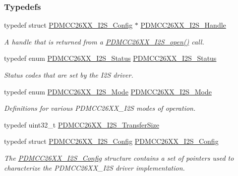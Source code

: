 \subsubsection*{Typedefs}
\begin{DoxyCompactItemize}
\item 
typedef struct \hyperlink{struct_p_d_m_c_c26_x_x___i2_s___config}{P\+D\+M\+C\+C26\+X\+X\+\_\+\+I2\+S\+\_\+\+Config} $\ast$ \hyperlink{_p_d_m_c_c26_x_x__util_8h_adc3b274b4a54e54316ad385fd4290c80}{P\+D\+M\+C\+C26\+X\+X\+\_\+\+I2\+S\+\_\+\+Handle}
\begin{DoxyCompactList}\small\item\em A handle that is returned from a \hyperlink{_p_d_m_c_c26_x_x__util_8h_a8168bcdab9f1e46c26823555df6f797f}{P\+D\+M\+C\+C26\+X\+X\+\_\+\+I2\+S\+\_\+open()} call. \end{DoxyCompactList}\item 
typedef enum \hyperlink{_p_d_m_c_c26_x_x__util_8h_ac1e4fbeb33409a874015d4e0609ddff1}{P\+D\+M\+C\+C26\+X\+X\+\_\+\+I2\+S\+\_\+\+Status} \hyperlink{_p_d_m_c_c26_x_x__util_8h_ad0f2102751f8a8f0bcd47dd154aa836c}{P\+D\+M\+C\+C26\+X\+X\+\_\+\+I2\+S\+\_\+\+Status}
\begin{DoxyCompactList}\small\item\em Status codes that are set by the I2\+S driver. \end{DoxyCompactList}\item 
typedef enum \hyperlink{_p_d_m_c_c26_x_x__util_8h_a7392b654a84f42e717a4df1485058a84}{P\+D\+M\+C\+C26\+X\+X\+\_\+\+I2\+S\+\_\+\+Mode} \hyperlink{_p_d_m_c_c26_x_x__util_8h_a2f220663270b5388de54e612e5773d98}{P\+D\+M\+C\+C26\+X\+X\+\_\+\+I2\+S\+\_\+\+Mode}
\begin{DoxyCompactList}\small\item\em Definitions for various P\+D\+M\+C\+C26\+X\+X\+\_\+\+I2\+S modes of operation. \end{DoxyCompactList}\item 
typedef uint32\+\_\+t \hyperlink{_p_d_m_c_c26_x_x__util_8h_a5b4e6b7c39c913bc6ae97261a5f2a226}{P\+D\+M\+C\+C26\+X\+X\+\_\+\+I2\+S\+\_\+\+Transfer\+Size}
\item 
typedef struct \hyperlink{struct_p_d_m_c_c26_x_x___i2_s___config}{P\+D\+M\+C\+C26\+X\+X\+\_\+\+I2\+S\+\_\+\+Config} \hyperlink{_p_d_m_c_c26_x_x__util_8h_ac69d2ed91954cdfe4c1bd668a2dab290}{P\+D\+M\+C\+C26\+X\+X\+\_\+\+I2\+S\+\_\+\+Config}
\begin{DoxyCompactList}\small\item\em The \hyperlink{struct_p_d_m_c_c26_x_x___i2_s___config}{P\+D\+M\+C\+C26\+X\+X\+\_\+\+I2\+S\+\_\+\+Config} structure contains a set of pointers used to characterize the P\+D\+M\+C\+C26\+X\+X\+\_\+\+I2\+S driver implementation. \end{DoxyCompactList}\item 

\end{DoxyCompactItemize}

